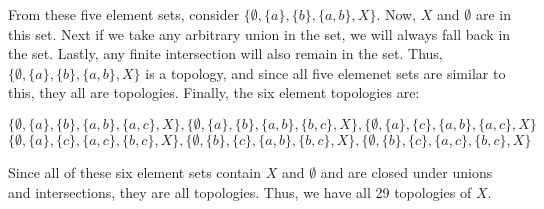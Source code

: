\begin{solution}
    From these five element sets, consider $\{\emptyset, \{a\}, \{b\}, \{a,b\}, X\}$. Now, $X$ and
    $\emptyset$ are in this set. Next if we take any arbitrary union in the set, we will always fall
    back in the set. Lastly, any finite intersection will also remain in the set. Thus,
    $\{\emptyset, \{a\}, \{b\}, \{a,b\}, X\}$ is a topology, and since all five elemenet sets are
    similar to this, they all are topologies. Finally, the six element topologies are:
    
    $$\{\emptyset, \{a\}, \{b\}, \{a,b\}, \{a,c\}, X\}, \{\emptyset,\{a\}, \{b\}, \{a,b\}, \{b,c\}, X\},
    \{\emptyset, \{a\}, \{c\}, \{a,b\}, \{a,c\}, X\}$$
    $$\{\emptyset,\{a\}, \{c\}, \{a,c\}, \{b,c\}, X\}, \{\emptyset, \{b\}, \{c\}, \{a,b\}, \{b,c\}, X\},
    \{\emptyset, \{b\}, \{c\}, \{a,c\}, \{b,c\}, X\}$$
    
    Since all of these six element sets contain $X$ and $\emptyset$ and are closed under unions and
    intersections, they are all topologies. Thus, we have all 29 topologies of $X$.

\end{solution}